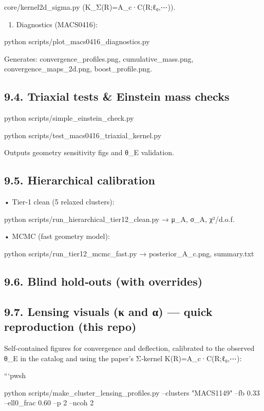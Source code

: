 \documentclass[11pt,a4paper]{article}
\begin{document}
core/kernel2d\_sigma.py (K\_Σ(R)=A\_c·C(R;ℓ₀,⋯)).


\begin{enumerate}
\item Diagnostics (MACS0416):
\end{enumerate}

python scripts/plot\_macs0416\_diagnostics.py  

Generates: convergence\_profiles.png, cumulative\_mass.png, convergence\_maps\_2d.png, boost\_profile.png.


\subsection{9.4. Triaxial tests \& Einstein mass checks}


python scripts/simple\_einstein\_check.py  

python scripts/test\_macs0416\_triaxial\_kernel.py  

Outputs geometry sensitivity figs and θ\_E validation.


\subsection{9.5. Hierarchical calibration}


• Tier‑1 clean (5 relaxed clusters):  

python scripts/run\_hierarchical\_tier12\_clean.py → μ\_A, σ\_A, χ²/d.o.f.  

• MCMC (fast geometry model):  

python scripts/run\_tier12\_mcmc\_fast.py → posterior\_A\_c.png, summary.txt


\subsection{9.6. Blind hold‑outs (with overrides)}


\subsection{9.7. Lensing visuals (κ and α) — quick reproduction (this repo)}


Self-contained figures for convergence and deflection, calibrated to the observed θ\_E in the catalog and using the paper’s Σ‑kernel K(R)=A\_c·C(R;ℓ₀,⋯):


```pwsh

python scripts/make\_cluster\_lensing\_profiles.py --clusters "MACS1149" --fb 0.33 --ell0\_frac 0.60 --p 2 --ncoh 2
\end{document}
